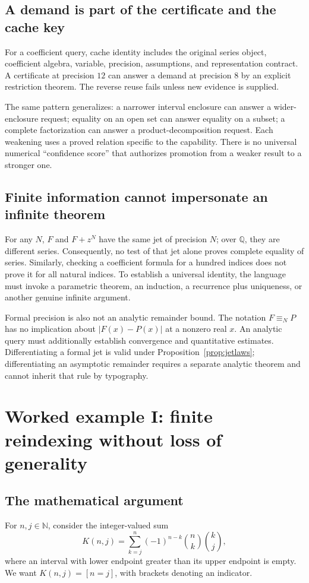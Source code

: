 \documentclass[11pt,a4paper]{article}
\newcommand{\N}{\mathbb N}
\newcommand{\Q}{\mathbb Q}
\theoremstyle{definition}
\begin{document}
\subsection{A demand is part of the certificate and the cache key}
For a coefficient query, cache identity includes the original series object, coefficient algebra, variable, precision, assumptions, and representation contract. A certificate at precision \(12\) can answer a demand at precision \(8\) by an explicit restriction theorem. The reverse reuse fails unless new evidence is supplied.

The same pattern generalizes: a narrower interval enclosure can answer a wider-enclosure request; equality on an open set can answer equality on a subset; a complete factorization can answer a product-decomposition request. Each weakening uses a proved relation specific to the capability. There is no universal numerical ``confidence score'' that authorizes promotion from a weaker result to a stronger one.

\subsection{Finite information cannot impersonate an infinite theorem}
For any \(N\), \(F\) and \(F+z^N\) have the same jet of precision \(N\); over \(\Q\), they are different series. Consequently, no test of that jet alone proves complete equality of series. Similarly, checking a coefficient formula for a hundred indices does not prove it for all natural indices. To establish a universal identity, the language must invoke a parametric theorem, an induction, a recurrence plus uniqueness, or another genuine infinite argument.

Formal precision is also not an analytic remainder bound. The notation \(F\equiv_NP\) has no implication about \(|F(x)-P(x)|\) at a nonzero real \(x\). An analytic query must additionally establish convergence and quantitative estimates. Differentiating a formal jet is valid under Proposition~\ref{prop:jetlaws}; differentiating an asymptotic remainder requires a separate analytic theorem and cannot inherit that rule by typography.

\section{Worked example I: finite reindexing without loss of generality}\label{sec:binomial}

\subsection{The mathematical argument}
For \(n,j\in\N\), consider the integer-valued sum
\[
 K(n,j)=\sum_{k=j}^{n}(-1)^{n-k}\binom nk\binom kj,
\]
where an interval with lower endpoint greater than its upper endpoint is empty. We want \(K(n,j)=[n=j]\), with brackets denoting an indicator.
\end{document}

